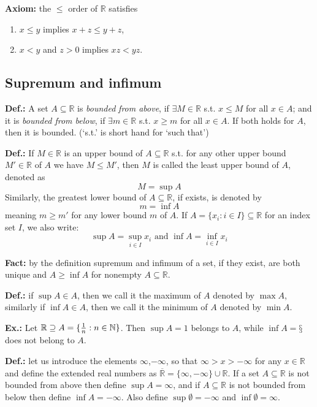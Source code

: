 \documentclass{article}
\begin{document}
\textbf{Axiom:} the $\leq$ order of $\mathbb{R}$ satisfies
\begin{enumerate}[label=\Roman*.]
  \item $x\leq y$ implies $x+z\leq y+z$,
  \item $x< y$ and $z>0$ implies $xz<yz$.
\end{enumerate}

\subsection{Supremum and infimum}

\textbf{Def.:} A set $A\subseteq \mathbb{R}$ is \textit{bounded} \textit{from above}, if $\exists M\in \mathbb{R}$ s.t.  $x\leq M$ for all $x\in A$; and it is \textit{bounded from below}, if $\exists m\in \mathbb{R}$ s.t.  $x\geq m$ for all $x\in A$. If both holds for $A$, then it is bounded.				(‘s.t.’ is short hand for ‘such that’)

\textbf{Def.:} If $M\in \mathbb{R}$ is an upper bound of $A\subseteq \mathbb{R}$ s.t. for any other upper bound $M'\in \mathbb{R}$ of $A$ we have $M\leq M'$, then $M$ is called the least upper bound of $A$, denoted as
\[
M=\sup A
\]
Similarly, the greatest lower bound of $A\subseteq \mathbb{R}$, if exists, is denoted by 
\[
m=\inf A
\]
  meaning $m\geq m'$ for any lower bound $m$ of $A$.
If $A=\{x_i: i\in I\}\subseteq \mathbb{R}$ for an index set $I$, we also write:
\[
\sup A=\sup_{i\in I}x_i \text{ and } \inf A = \inf_{i\in I}x_i
\]

\textbf{Fact:} by the definition supremum and infimum of a set, if they exist, are both unique and $A\geq \inf A$ for nonempty $A\subseteq \mathbb{R}$.

\textbf{Def.:} if $\sup A\in A$, then we call it the maximum of $A$ denoted by $\max A$, similarly if $\inf A \in A$, then we call it the minimum of $A$ denoted by $\min A$.

\textbf{Ex.:} Let $\mathbb{R}\supseteq A=\{{1\over n} : n\in \mathbb{N}\}$. Then $\sup A=1$ belongs to $A$, while $\inf A=§$ does not belong to $A$.

\textbf{Def.:} let us introduce the elements $\infty$,$-\infty$, so that $\infty >x>-\infty$ for any $x\in \mathbb{R}$ and define the extended real numbers as $\overline{\mathbb{R}}=\{\infty, -\infty\}\cup \mathbb{R}$. If a set $A\subseteq \mathbb{R}$ is not bounded from above then define $\sup A=\infty$, and if $A\subseteq \mathbb{R}$ is not bounded from below then define $\inf A=-\infty$. Also define $\sup \emptyset=-\infty$ and $\inf \emptyset = \infty$.
\end{document}
